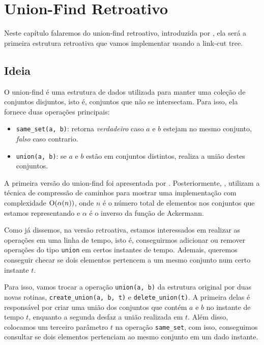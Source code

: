 
\chapter{Union-Find Retroativo}
\label{cap:union-find}

Neste capítulo falaremos do union-find retroativo, introduzida por \citet{10.1145/1240233.1240236}, ela será a primeira estrutura retroativa que vamos implementar usando a link-cut tree.

\section{Ideia}
\label{sec:uf-ideia}

O union-find é uma estrutura de dados utilizada para manter uma coleção de conjuntos disjuntos, isto é, conjuntos que não se intersectam. Para isso, ela fornece duas operações principais:

\begin{itemize}
    \item \texttt{same\_set(a, b)}: retorna \emph{verdadeiro} caso $a$ e $b$ estejam no mesmo conjunto, \emph{falso} caso contrario.
    \item \texttt{union(a, b)}: se $a$ e $b$ estão em conjuntos distintos, realiza a união destes conjuntos.
\end{itemize}

A primeira versão do union-find foi apresentada por \citet{10.1145/364099.364331}. Posteriormente, \citet{10.1145/62.2160}, utilizam a técnica de compressão de caminhos para mostrar uma implementação com complexidade $\mathrm{O}( \alpha (n) )$, onde $n$ é o número total de elementos nos conjuntos que estamos representando e $\alpha$ é o inverso da função de Ackermann.

Como já dissemos, na versão retroativa, estamos interessados em realizar as operações em uma linha de tempo, isto é, conseguirmos adicionar ou remover operações do tipo \texttt{union} em certos instantes de tempo. Ademais, queremos conseguir checar se dois elementos pertencem a um mesmo conjunto num certo instante $t$.

Para isso, vamos trocar a operação \texttt{union(a, b)} da estrutura original por duas novas rotinas, \texttt{create\_union(a, b, t)} e \texttt{delete\_union(t)}. A primeira delas é responsável por criar uma união dos conjuntos que contém $a$ e $b$ no instante de tempo $t$, enquanto a segunda desfaz a união realizada em $t$. Além disso, colocamos um terceiro parâmetro $t$ na operação \texttt{same\_set}, com isso, conseguimos consultar se dois elementos pertenciam ao mesmo conjunto em um dado instante.

